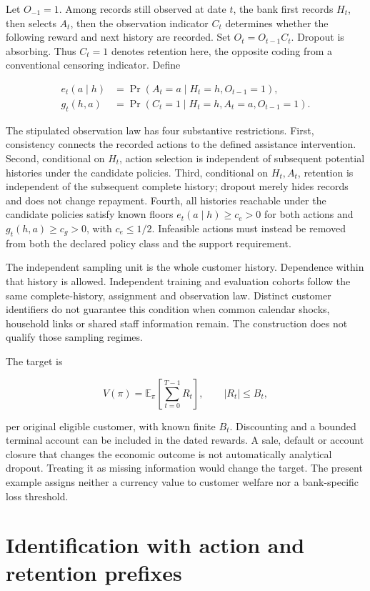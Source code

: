 Let \(O_{-1}=1\). Among records still observed at date \(t\), the bank
first records \(H_t\), then selects \(A_t\), then the observation
indicator \(C_t\) determines whether the following reward and next
history are recorded. Set \(O_t=O_{t-1}C_t\). Dropout is absorbing. Thus
\(C_t=1\) denotes retention here, the opposite coding from a
conventional censoring indicator. Define

\[
\begin{aligned}
 e_t(a\mid h)&=\Pr(A_t=a\mid H_t=h,O_{t-1}=1),\\
 g_t(h,a)&=\Pr(C_t=1\mid H_t=h,A_t=a,O_{t-1}=1).
\end{aligned}
\]

The stipulated observation law has four substantive restrictions. First,
consistency connects the recorded actions to the defined assistance
intervention. Second, conditional on \(H_t\), action selection is
independent of subsequent potential histories under the candidate
policies. Third, conditional on \(H_t,A_t\), retention is independent of
the subsequent complete history; dropout merely hides records and does
not change repayment. Fourth, all histories reachable under the
candidate policies satisfy known floors \(e_t(a\mid h)\ge c_e>0\) for
both actions and \(g_t(h,a)\ge c_g>0\), with \(c_e\le1/2\). Infeasible
actions must instead be removed from both the declared policy class and
the support requirement.

The independent sampling unit is the whole customer history. Dependence
within that history is allowed. Independent training and evaluation
cohorts follow the same complete-history, assignment and observation
law. Distinct customer identifiers do not guarantee this condition when
common calendar shocks, household links or shared staff information
remain. The construction does not qualify those sampling regimes.

The target is

\[
 V(\pi)=\mathbb E_\pi\left[\sum_{t=0}^{T-1} R_t\right],
 \qquad |R_t|\le B_t,
\]

per original eligible customer, with known finite \(B_t\). Discounting
and a bounded terminal account can be included in the dated rewards. A
sale, default or account closure that changes the economic outcome is
not automatically analytical dropout. Treating it as missing information
would change the target. The present example assigns neither a currency
value to customer welfare nor a bank-specific loss threshold.

\hypertarget{identification-with-action-and-retention-prefixes}{%
\section{Identification with action and retention
prefixes}\label{identification-with-action-and-retention-prefixes}}

